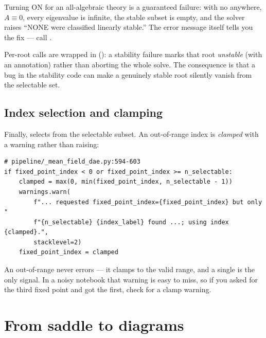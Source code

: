 \begin{gotcha}
Turning  ON for an all-algebraic theory is a guaranteed
failure: with no  anywhere, $A \equiv 0$, every eigenvalue is infinite,
the stable subset is empty, and the solver raises ``NONE were classified linearly
stable.'' The error message itself tells you the fix --- call
.
\end{gotcha}

\begin{gotcha}
Per-root  calls are wrapped in 
(): a stability failure marks that root
\emph{unstable} (with an  annotation) rather than aborting the whole
solve. The consequence is that a bug in the stability code can make a genuinely
stable root silently vanish from the selectable set.
\end{gotcha}

\subsection{Index selection and clamping}

Finally,  selects from the selectable subset. An
out-of-range index is \emph{clamped} with a warning rather than raising:

\begin{lstlisting}
# pipeline/_mean_field_dae.py:594-603
if fixed_point_index < 0 or fixed_point_index >= n_selectable:
    clamped = max(0, min(fixed_point_index, n_selectable - 1))
    warnings.warn(
        f"... requested fixed_point_index={fixed_point_index} but only "
        f"{n_selectable} {index_label} found ...; using index {clamped}.",
        stacklevel=2)
    fixed_point_index = clamped
\end{lstlisting}

\begin{gotcha}
An out-of-range  never errors --- it clamps to the valid
range, and a single  is the only signal. In a noisy notebook
that warning is easy to miss, so if you asked for the third fixed point and got
the first, check for a clamp warning.
\end{gotcha}

\section{From saddle to diagrams}

